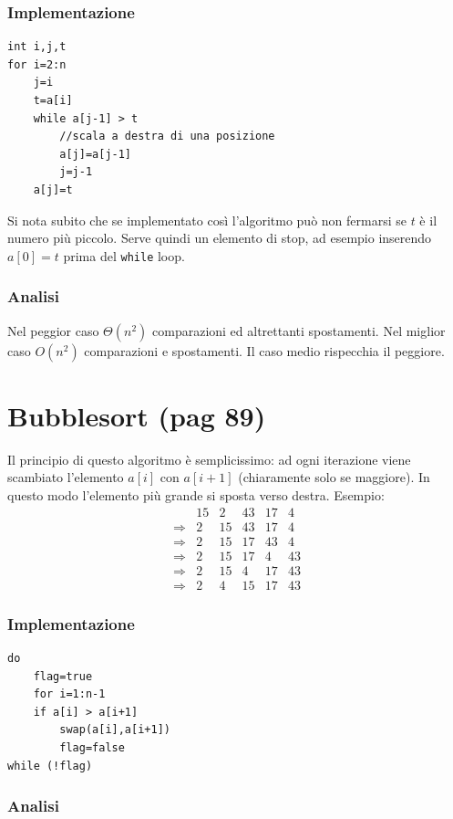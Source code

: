 \documentclass[a4paper]{book}
\newcommand{\inline}[1]{\lstinline!#1!}%
\newcommand{\lstIndent}{4}
\begin{document}
\subsubsection*{Implementazione}
\begin{lstlisting}[tabsize=\lstIndent]
int i,j,t
for i=2:n
	j=i
	t=a[i]
	while a[j-1] > t
		//scala a destra di una posizione
		a[j]=a[j-1]
		j=j-1
	a[j]=t
\end{lstlisting}
Si nota subito che se implementato così l'algoritmo può non fermarsi se $t$ è il numero più piccolo. Serve quindi un elemento di stop, ad esempio inserendo $a[0]=t$ prima del \inline{while} loop.

\subsubsection*{Analisi}

Nel peggior caso $\Theta (n^2)$ comparazioni ed altrettanti spostamenti. Nel miglior caso $O(n^2)$ comparazioni e spostamenti. Il caso medio rispecchia il peggiore.

\section{Bubblesort (pag 89)}
Il principio di questo algoritmo è semplicissimo: ad ogni iterazione viene scambiato l'elemento $a[i]$ con $a[i+1]$ (chiaramente solo se maggiore). In questo modo l'elemento più grande si sposta verso destra. Esempio:
\[\begin{array}{*{20}{c}}
{}&{15}&2&{43}&{17}&4\\
{\Rightarrow}&2&{15}&{43}&{17}&4\\
{\Rightarrow}&2&{15}&{17}&{43}&4\\
{\Rightarrow}&2&{15}&{17}&4&{43}\\
{\Rightarrow}&2&{15}&4&{17}&{43}\\
{\Rightarrow}&2&4&{15}&{17}&{43}
\end{array}\]
\subsubsection*{Implementazione}
\begin{lstlisting}[tabsize=\lstIndent]
do
	flag=true
	for i=1:n-1
	if a[i] > a[i+1] 
		swap(a[i],a[i+1])
		flag=false
while (!flag)
\end{lstlisting}
\subsubsection*{Analisi}
\end{document}

